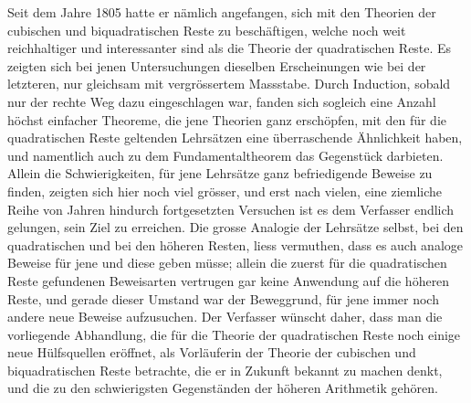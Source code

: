 \documentclass[12pt]{article}
\begin{document}
Seit dem Jahre 1805 hatte er nämlich angefangen, sich mit den Theorien der cubischen und biquadratischen Reste zu beschäftigen, welche noch weit reichhaltiger und interessanter sind als die Theorie der quadratischen Reste. Es zeigten sich bei jenen Untersuchungen dieselben Erscheinungen wie bei der letzteren, nur gleichsam mit vergrössertem Massstabe. Durch Induction, sobald nur der rechte Weg dazu eingeschlagen war, fanden sich sogleich eine Anzahl höchst einfacher Theoreme, die jene Theorien ganz erschöpfen, mit den für die quadratischen Reste geltenden Lehrsätzen eine überraschende Ähnlichkeit haben, und namentlich auch zu dem Fundamentaltheorem das Gegenstück darbieten. Allein die Schwierigkeiten, für jene Lehrsätze ganz befriedigende Beweise zu finden, zeigten sich hier noch viel grösser, und erst nach vielen, eine ziemliche Reihe von Jahren hindurch fortgesetzten Versuchen ist es dem Verfasser endlich gelungen, sein Ziel zu erreichen. Die grosse Analogie der Lehrsätze selbst, bei den quadratischen und bei den höheren Resten, liess vermuthen, dass es auch analoge Beweise für jene und diese geben müsse; allein die zuerst für die quadratischen Reste gefundenen Beweisarten vertrugen gar keine Anwendung auf die höheren Reste, und gerade dieser Umstand war der Beweggrund, für jene immer noch andere neue Beweise aufzusuchen. Der Verfasser wünscht daher, dass man die vorliegende Abhandlung, die für die Theorie der quadratischen Reste noch einige neue Hülfsquellen eröffnet, als Vorläuferin der Theorie der cubischen und biquadratischen Reste betrachte, die er in Zukunft bekannt zu machen denkt, und die zu den schwierigsten Gegenständen der höheren Arithmetik gehören.
\end{document}
